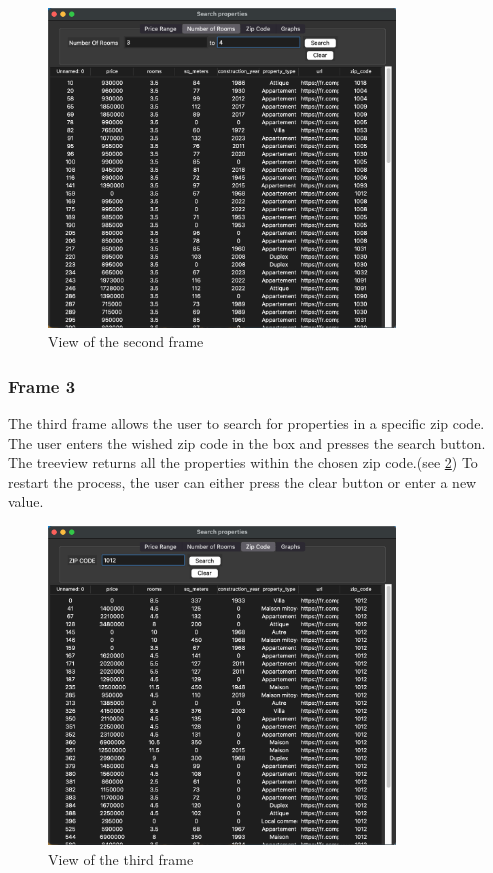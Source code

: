 \documentclass[main]{subfiles}
\begin{document}
\begin{figure}[htbp]
    \centerline{
        \includegraphics[width = 92mm]{prog_9.png}}
    \caption{View of the second frame}
    \label{fig:frame2}
\end{figure}

\subsubsection{Frame 3}
The third frame allows the user to search for properties in a specific zip code. 
The user enters the wished zip code in the box and presses the search button. 
The treeview returns all the properties within the chosen zip code.(see \ref{fig:frame3})
To restart the process, the user can either press the clear button or enter a new value.

\begin{figure}[htbp]
    \centerline{
        \includegraphics[width = 92mm]{prog_10.png}}
    \caption{View of the third frame}
    \label{fig:frame3}
\end{figure}
\end{document}
